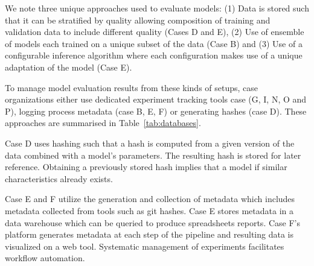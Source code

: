 We note three unique approaches used to evaluate models: (1) Data is stored such that it can be stratified by quality allowing composition of training and validation data to include different quality (Cases D and E), (2) Use of ensemble of models each trained on a unique subset of the data (Case B) and (3) Use of a configurable inference algorithm where each configuration makes use of a unique adaptation of the model (Case E). %

To manage model evaluation results from these kinds of setups, case organizations either use dedicated experiment tracking tools case (G, I, N, O and P), logging process metadata (case B, E, F) or generating hashes (case D). These approaches are summarised in Table~\ref{tab:databases}. 

Case D uses hashing such that a hash is computed from a given version of the data combined with a model's parameters. The resulting hash is stored for later reference. Obtaining a previously stored hash implies that a model if similar characteristics already exists. %

Case E and F utilize the generation and collection of metadata which includes metadata collected from tools such as git hashes. Case E stores metadata in a data warehouse which can be queried to produce spreadsheets reports. Case F's platform generates metadata at each step of the pipeline and resulting data is visualized on a web tool.
Systematic management of experiments facilitates workflow automation. %


